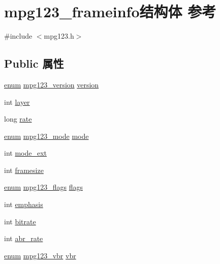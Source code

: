 \hypertarget{structmpg123__frameinfo}{}\section{mpg123\+\_\+frameinfo结构体 参考}
\label{structmpg123__frameinfo}


{\ttfamily \#include $<$mpg123.\+h$>$}

\subsection*{Public 属性}
\begin{DoxyCompactItemize}
\item 
\hyperlink{interfaceenum}{enum} \hyperlink{group__mpg123__status_ga0553c78534d6d130df2d1dc0df675748}{mpg123\+\_\+version} \hyperlink{structmpg123__frameinfo_aa1276e21b0fd007148ac85b6290de057}{version}
\item 
int \hyperlink{structmpg123__frameinfo_a23b3cad377729431a601cff6dd227ee2}{layer}
\item 
long \hyperlink{structmpg123__frameinfo_ab0e716a76ae87991e4607e5803da6899}{rate}
\item 
\hyperlink{interfaceenum}{enum} \hyperlink{group__mpg123__status_ga044931724a9a987a86c2eea02f85cc4b}{mpg123\+\_\+mode} \hyperlink{structmpg123__frameinfo_a2d4adb8ca9bd6dc0de36c8dca3fe531d}{mode}
\item 
int \hyperlink{structmpg123__frameinfo_ad9c559387cf061d05384b4c204cd0e97}{mode\+\_\+ext}
\item 
int \hyperlink{structmpg123__frameinfo_a8846bf9e4d0f9246bf04a4d00254fce9}{framesize}
\item 
\hyperlink{interfaceenum}{enum} \hyperlink{group__mpg123__status_gaf527c5a99203cb8591b0e0dfb2615303}{mpg123\+\_\+flags} \hyperlink{structmpg123__frameinfo_a9cfdc10a11d1414d28e014f260756525}{flags}
\item 
int \hyperlink{structmpg123__frameinfo_a7b3a682d1c80446b4a01b9f6b6f8b470}{emphasis}
\item 
int \hyperlink{structmpg123__frameinfo_ac8bfd092c3c98ba1e97111709c036a4e}{bitrate}
\item 
int \hyperlink{structmpg123__frameinfo_aefb56c909ed7297d4b78aebdb478995a}{abr\+\_\+rate}
\item 
\hyperlink{interfaceenum}{enum} \hyperlink{group__mpg123__status_ga8253714e77705037271f377f33858876}{mpg123\+\_\+vbr} \hyperlink{structmpg123__frameinfo_a48708817882f58b0a32c1e9db6e9fd74}{vbr}
\end{DoxyCompactItemize}


